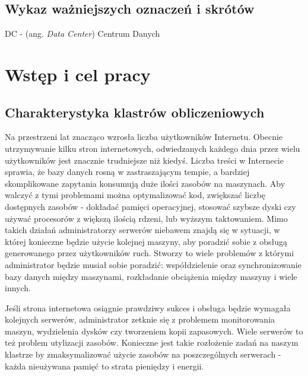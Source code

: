 \documentclass[10pt,a4paper,titlepage,twoside]{report}
\begin{document}
\newpage
{}
\section*{Wykaz ważniejszych oznaczeń i skrótów}



DC - (ang. \textit{Data Center}) Centrum Danych\\
\newline


\newpage
{}

\onehalfspacing

\chapter{Wstęp i cel pracy}
\section{Charakterystyka klastrów obliczeniowych}
\indent \indent Na przestrzeni lat znacząco wzrosła liczba użytkowników Internetu\cite{ad1}. Obecnie utrzymywanie kilku stron internetowych, odwiedzanych każdego dnia przez wielu użytkowników jest znacznie trudniejsze niż kiedyś\cite{ad1}. Liczba treści w Internecie sprawia, że bazy danych rosną w zastraszającym tempie, a bardziej skomplikowane zapytania konsumują duże ilości zasobów na maszynach. Aby walczyć z tymi problemami można optymalizować kod, zwiększać liczbę dostępnych zasobów - dokładać pamięci operacyjnej, stosować szybsze dyski czy używać procesorów z większą ilością rdzeni, lub wyższym taktowaniem. Mimo takich działań administratorzy serwerów niebawem znajdą się w sytuacji, w której konieczne będzie użycie kolejnej maszyny, aby poradzić sobie z obsługą generowanego przez użytkowników ruch\cite{ad2}. Stworzy to wiele problemów z którymi administrator będzie musiał sobie poradzić: współdzielenie oraz synchronizowanie bazy danych między maszynami, rozkładanie obciążenia między maszyny i wiele innych\cite{ad2}.

Jeśli strona internetowa osiągnie prawdziwy sukces i obsługa będzie wymagała kolejnych serwerów, administrator zetknie się z problemem monitorowania maszyn, wydzielenia dysków czy tworzeniem kopii zapasowych. Wiele serwerów to też problem utylizacji zasobów. Konieczne jest takie rozłożenie zadań na naszym klastrze by zmaksymalizować użycie zasobów na poszczególnych serwerach - każda nieużywana pamięć to strata pieniędzy i energii\cite{ad3}.
\end{document}
